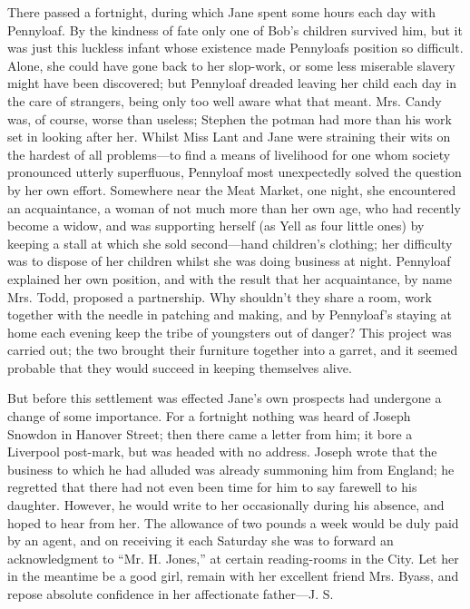 There passed a fortnight, during which Jane spent some hours each day
with Pennyloaf. By the kindness of fate only one of Bob's children
survived him, but it was just this luckless infant whose existence made
Pennyloafs position so difficult. Alone, she could have gone back to her
slop-work, or some less miserable slavery might have been discovered;
but Pennyloaf dreaded leaving her child each day in the care of
strangers, being only too well aware what that meant. Mrs. Candy was, of
course, worse than useless; Stephen the potman had more than his work
set in looking after her. Whilst Miss Lant and Jane were straining their
wits on the hardest of all problems---to find a means of livelihood for
one {\protect\hypertarget{236}{}{}}whom society pronounced utterly
superfluous, Pennyloaf most unexpectedly solved the question by her own
effort. Somewhere near the Meat Market, one night, she encountered an
acquaintance, a woman of not much more than her own age, who had
recently become a widow, and was supporting herself (as Yell as four
little ones) by keeping a stall at which she sold second---hand
children's clothing; her difficulty was to dispose of her children
whilst she was doing business at night. Pennyloaf explained her own
position, and with the result that her acquaintance, by name Mrs. Todd,
proposed a partnership. Why shouldn't they share a room, work together
with the needle in patching and making, and by Pennyloaf's staying at
home each evening keep the tribe of youngsters out of danger? This
project was carried out; the two brought their furniture together into a
garret, and it seemed probable that they would succeed in keeping
themselves alive.

But before this settlement was effected Jane's own prospects had
undergone a change of some importance. For a fortnight nothing was heard
of Joseph Snowdon in Hanover {\protect\hypertarget{237}{}{}}Street; then
there came a letter from him; it bore a Liverpool post-mark, but was
headed with no address. Joseph wrote that the business to which he had
alluded was already summoning him from England; he regretted that there
had not even been time for him to say farewell to his daughter. However,
he would write to her occasionally during his absence, and hoped to hear
from her. The allowance of two pounds a week would be duly paid by an
agent, and on receiving it each Saturday she was to forward an
acknowledgment to ``Mr. H. Jones,'' at certain reading-rooms in the
City. Let her in the meantime be a good girl, remain with her excellent
friend Mrs. Byass, and repose absolute confidence in her affectionate
father---J. S.

